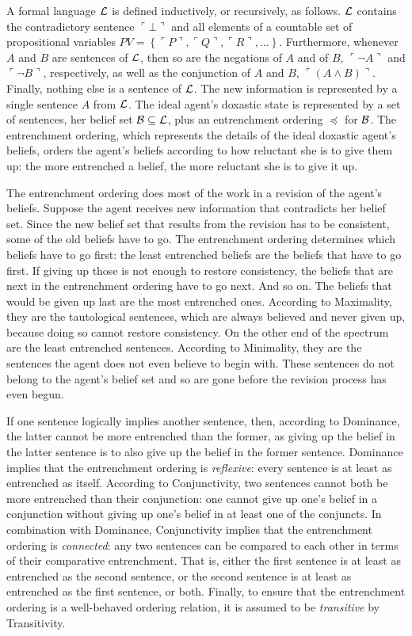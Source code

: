 A formal language $\cal L$ is defined inductively, or recursively, as follows. $\cal L$ contains the contradictory sentence $\ulcorner\bot\urcorner$ and all elements of a countable set of propositional variables $PV=\left\{\ulcorner P\urcorner,\ulcorner Q\urcorner,\ulcorner R\urcorner,\ldots\right\}$. Furthermore, whenever $A$ and $B$ are sentences of $\cal L$, then so are the negations of $A$ and of $B$, $\ulcorner\neg A\urcorner$ and $\ulcorner\neg B\urcorner$, respectively, as well as the conjunction of $A$ and $B$, $\ulcorner\left(A\wedge B\right)\urcorner$. Finally, nothing else is a sentence of $\cal L$. The new information is represented by a single sentence $A$ from $\cal L$. The ideal agent's doxastic state is represented by a set of sentences, her belief set $\cal B\subseteq L$, plus an entrenchment ordering $\preceq$ for $\cal B$. The entrenchment ordering, which represents the details of the ideal doxastic agent's beliefs, orders the agent's beliefs according to how reluctant she is to give them up: the more entrenched a belief, the more reluctant she is to give it up.

The entrenchment ordering does most of the work in a revision of the agent's beliefs. Suppose the agent receives new information that contradicts her belief set. Since the new belief set that results from the revision has to be consistent, some of the old beliefs have to go. The entrenchment ordering determines which beliefs have to go first: the least entrenched beliefs are the beliefs that have to go first. If giving up those is not enough to restore consistency, the beliefs that are next in the entrenchment ordering have to go next. And so on. The beliefs that would be given up last are the most entrenched ones. According to Maximality, they are the tautological sentences, which are always believed and never given up, because doing so cannot restore consistency. On the other end of the spectrum are the least entrenched sentences. According to Minimality, they are the sentences the agent does not even believe to begin with. These sentences do not belong to the agent's belief set and so are gone before the revision process has even begun.

If one sentence logically implies another sentence, then, according to Dominance, the latter cannot be more entrenched than the former, as giving up the belief in the latter sentence is to also give up the belief in the former sentence. Dominance implies that the entrenchment ordering is \emph{reflexive}: every sentence is at least as entrenched as itself. According to Conjunctivity, two sentences cannot both be more entrenched than their conjunction: one cannot give up one's belief in a conjunction without giving up one's belief in at least one of the conjuncts. In combination with Dominance, Conjunctivity implies that the entrenchment ordering is \emph{connected}: any two sentences can be compared to each other in terms of their comparative entrenchment. That is, either the first sentence is at least as entrenched as the second sentence, or the second sentence is at least as entrenched as the first sentence, or both. Finally, to ensure that the entrenchment ordering is a well-behaved ordering relation, it is assumed to be \emph{transitive} by Transitivity.

